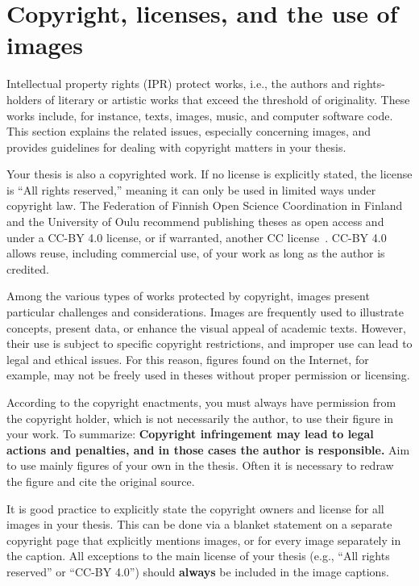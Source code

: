 \section{Copyright, licenses, and the use of images}
\label{copyright}
Intellectual property rights (IPR) protect works, i.e., the authors
and rights-holders of literary or artistic works that exceed the
threshold of originality. These works include, for instance, texts,
images, music, and computer software code. This section explains the
related issues, especially concerning images, and provides guidelines
for dealing with copyright matters in your thesis.

Your thesis is also a copyrighted work. If no license is explicitly
stated, the license is \enquote{All rights reserved,} meaning it can only be
used in limited ways under copyright law. The Federation of Finnish
Open Science Coordination in Finland and the University of Oulu
recommend publishing theses as open access and under a CC-BY 4.0 license,
or if warranted, another CC license~\cite{coordination_open_2024}.
CC-BY 4.0 allows reuse, including commercial use, of your work as long as
the author is credited.

Among the various types of works protected by copyright, images
present particular challenges and considerations. Images are
frequently used to illustrate concepts, present data, or enhance the
visual appeal of academic texts. However, their use is subject to
specific copyright restrictions, and improper use can lead to legal
and ethical issues.  For this reason, figures found on the Internet,
for example, may not be freely used in theses without proper
permission or licensing.

According to the copyright enactments, you must always have
permission from the copyright holder, which is not necessarily the
author, to use their figure in your work. To summarize:
\textbf{Copyright infringement may lead to legal actions and
penalties, and in those cases the author is responsible.} Aim to use
mainly figures of your own in the thesis. Often it is necessary to redraw the figure and cite the
original source.

It is good practice to explicitly state the copyright owners and
license for all images in your thesis. This can be done via a blanket
statement on a separate copyright page that explicitly mentions
images, or for every image separately in the caption. All exceptions
to the main license of your thesis (e.g., \enquote{All rights reserved} or
\enquote{CC-BY 4.0}) should \textbf{always} be included in the image
captions.

